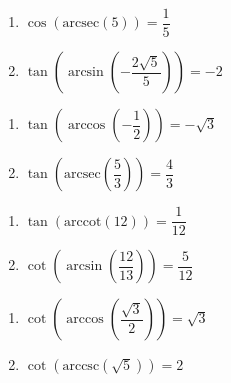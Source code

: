 \begin{multicols}{2}

\begin{enumerate}

\setcounter{enumi}{\value{HW}}

\item  $\cos\left(\text{arcsec}\left( 5 \right)\right) = \dfrac{1}{5}$ 
\item  $\tan\left(\arcsin\left(-\dfrac{2\sqrt{5}}{5}\right)\right)=-2$

\setcounter{HW}{\value{enumi}}

\end{enumerate}

\end{multicols}

\begin{multicols}{2}

\begin{enumerate}

\setcounter{enumi}{\value{HW}}

\item  $\tan\left(\arccos\left(-\dfrac{1}{2}\right)\right) = -\sqrt{3}$
\item  $\tan\left(\text{arcsec}\left(\dfrac{5}{3}\right)\right) = \dfrac{4}{3}$

\setcounter{HW}{\value{enumi}}

\end{enumerate}

\end{multicols}

\begin{multicols}{2}

\begin{enumerate}

\setcounter{enumi}{\value{HW}}

\item  $\tan\left(\text{arccot}\left( 12  \right)\right) = \dfrac{1}{12}$ 
\item  $\cot\left(\arcsin\left(\dfrac{12}{13}\right)\right) = \dfrac{5}{12}$

\setcounter{HW}{\value{enumi}}

\end{enumerate}

\end{multicols}

\begin{multicols}{2}

\begin{enumerate}

\setcounter{enumi}{\value{HW}}

\item  $\cot\left(\arccos\left(\dfrac{\sqrt{3}}{2}\right)\right) = \sqrt{3}$
\item  $\cot\left(\text{arccsc}\left(\sqrt{5}\right)\right) = 2$ 

\setcounter{HW}{\value{enumi}}

\end{enumerate}

\end{multicols}

